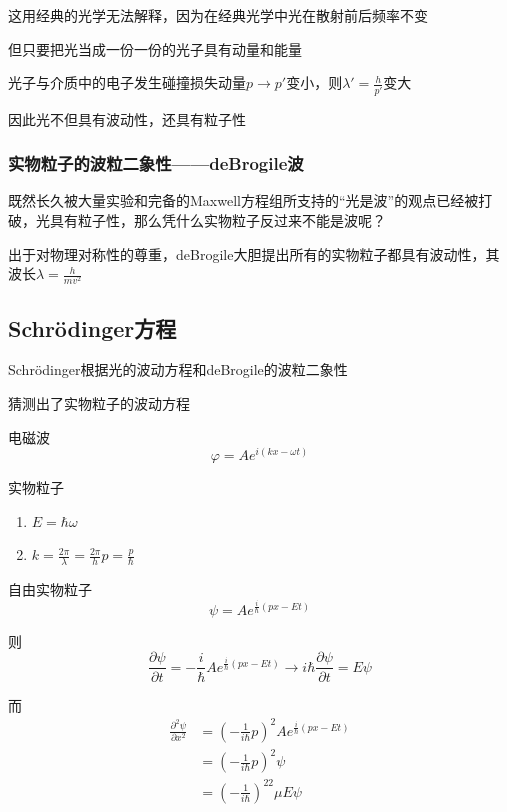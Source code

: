 \documentclass[lang=cn,10pt]{elegantbook}
\begin{document}
这用经典的光学无法解释，因为在经典光学中光在散射前后频率不变

但只要把光当成一份一份的光子具有动量和能量

光子与介质中的电子发生碰撞损失动量$p\rightarrow p'$变小，则$\lambda'=\frac{h}{p'}$变大

因此光不但具有波动性，还具有粒子性

\subsubsection{实物粒子的波粒二象性——deBrogile波}
既然长久被大量实验和完备的Maxwell方程组所支持的“光是波”的观点已经被打破，光具有粒子性，那么凭什么实物粒子反过来不能是波呢？

出于对物理对称性的尊重，deBrogile大胆提出所有的实物粒子都具有波动性，其波长$
\lambda=\frac{h}{mv^2}$
\subsection{Schrödinger方程}
Schrödinger根据光的波动方程和deBrogile的波粒二象性

猜测出了实物粒子的波动方程

电磁波
\begin{equation}
	\varphi =Ae^{i\left( kx-\omega t \right)}
\end{equation}

实物粒子
\begin{enumerate}
	\item $E=\hbar\omega$
	\item $k=\frac{2\pi}{\lambda}=\frac{2\pi}{h}p=\frac{p}{\hbar}$
\end{enumerate}

自由实物粒子
\begin{equation}
	\psi =Ae^{\frac{i}{\hbar}\left( px-Et \right)}
\end{equation}

则
\begin{equation}
	\frac{\partial \psi}{\partial t}=-\frac{i}{\hbar}Ae^{\frac{i}{\hbar}\left( px-Et \right)}\rightarrow i\hbar \frac{\partial \psi}{\partial t}=E\psi 
\end{equation}

而
\begin{equation}
	\begin{split}
		\frac{\partial ^2\psi}{\partial x^2}&=\left( -\frac{1}{i\hbar}p \right) ^2Ae^{\frac{i}{\hbar}\left( px-Et \right)}
		\\
		&=\left( -\frac{1}{i\hbar}p \right) ^2\psi 
		\\
		&=\left( -\frac{1}{i\hbar} \right) ^22\mu E\psi 
	\end{split}
\end{equation}
\end{document}
